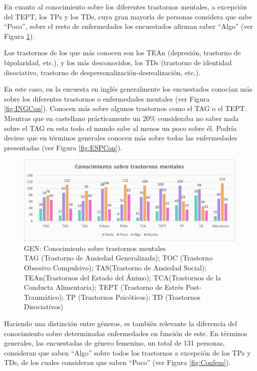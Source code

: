 \documentclass[12pt, a4paper,twoside,titlepage]{book}
\begin{document}
En cuanto al conocimiento sobre los diferentes trastornos mentales, a excepción del TEPT, los TPs y los TDs, cuya gran mayoría de personas considera que sabe “Poco”, sobre el resto de enfermedades los encuestados afirman saber “Algo” (ver Figura \ref{fig:Conocimiento}). 

Los trastornos de los que más conocen son los TEAn (depresión, trastorno de bipolaridad, etc.), y los más desconocidos, los TDs (trastorno de identidad disociativo, trastorno de despersonalización-desrealización, etc.). 

En este caso, en la encuesta en inglés generalmente los encuestados conocían más sobre los diferentes trastornos o enfermedades mentales (ver Figura \ref{fig:INGCon}). Conocen más sobre algunos trastornos como el TAG o el TEPT. Mientras que en castellano prácticamente un 20\% consideraba no saber nada sobre el TAG en esta todo el mundo sabe al menos un poco sobre él. Podría decirse que en términos generales conocen más sobre todas las enfermedades presentadas (ver Figura \ref{fig:ESPCon}). 


\begin{figure}
\centering
 \includegraphics[width=1\linewidth]{Imagenes Form GEN/6GENCon}
 \caption{GEN: Conocimiento sobre trastornos mentales\\
 TAG (Trastorno de Ansiedad Generalizada); TOC (Trastorno Obsesivo Compulsivo); TAS(Trastorno de Ansiedad Social); TEAn(Trastornos del Estado del Ánimo); TCA(Trastornos de la Conducta Alimentaria); TEPT (Trastorno de Estrés Post-Traumático); TP (Trastornos Psicóticos); TD (Trastornos Disociativos) }
 \label{fig:Conocimiento}
 \end{figure}


Haciendo una distinción entre géneros, es también relevante la diferencia del conocimiento sobre determinadas enfermedades en función de este. En términos generales, las encuestadas de género femenino, un total de 131 personas, consideran que saben “Algo” sobre todos los trastornos a excepción de los TPs y TDs, de los cuales consideran que saben “Poco” (ver Figura \ref{fig:Confem}). 
\end{document}
